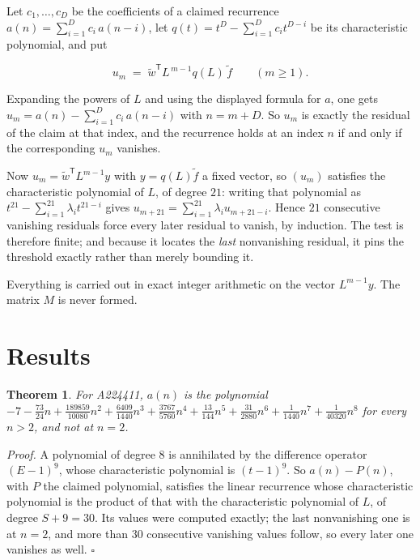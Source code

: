 \documentclass[11pt]{article}
\newtheorem{theorem}{Theorem}
\theoremstyle{definition}
\begin{document}
Let $c_1,\dots,c_D$ be the coefficients of a claimed recurrence $a(n) = \sum_{i=1}^{D} c_i\,a(n-i)$, let $q(t) = t^{D} - \sum_{i=1}^{D} c_i t^{D-i}$ be its characteristic polynomial, and put

\[u_m \;=\; \tilde w^{\mathsf T} L^{\,m-1} q(L)\,\tilde f \qquad (m \ge 1).\]

Expanding the powers of $L$ and using the displayed formula for $a$, one gets $u_m = a(n) - \sum_{i=1}^{D} c_i\,a(n-i)$ with $n = m + D$. So $u_m$ is exactly the residual of the claim at that index, and the recurrence holds at an index $n$ if and only if the corresponding $u_m$ vanishes.

Now $u_m = \tilde w^{\mathsf T} L^{m-1} y$ with $y = q(L)\tilde f$ a fixed vector, so $(u_m)$ satisfies the characteristic polynomial of $L$, of degree $21$: writing that polynomial as $t^{21} - \sum_{i=1}^{21} \lambda_i t^{21-i}$ gives $u_{m+21} = \sum_{i=1}^{21} \lambda_i u_{m+21-i}$. Hence $21$ consecutive vanishing residuals force every later residual to vanish, by induction. The test is therefore finite; and because it locates the {\itshape last} nonvanishing residual, it pins the threshold exactly rather than merely bounding it.

Everything is carried out in exact integer arithmetic on the vector $L^{m-1}y$. The matrix $M$ is never formed.

\section{Results}

\begin{theorem} For A224411, $a(n)$ is the polynomial $-7 - \frac{73}{24}n + \frac{189859}{10080}n^{2} + \frac{6409}{1440}n^{3} + \frac{3767}{5760}n^{4} + \frac{13}{144}n^{5} + \frac{31}{2880}n^{6} + \frac{1}{1440}n^{7} + \frac{1}{40320}n^{8}$ for every $n > 2$, and not at $n = 2$.\end{theorem}

{\itshape Proof.} A polynomial of degree $8$ is annihilated by the difference operator $(E-1)^{9}$, whose characteristic polynomial is $(t-1)^{9}$. So $a(n) - P(n)$, with $P$ the claimed polynomial, satisfies the linear recurrence whose characteristic polynomial is the product of that with the characteristic polynomial of $L$, of degree $S + 9 = 30$. Its values were computed exactly; the last nonvanishing one is at $n = 2$, and more than $30$ consecutive vanishing values follow, so every later one vanishes as well. $\square$
\end{document}
